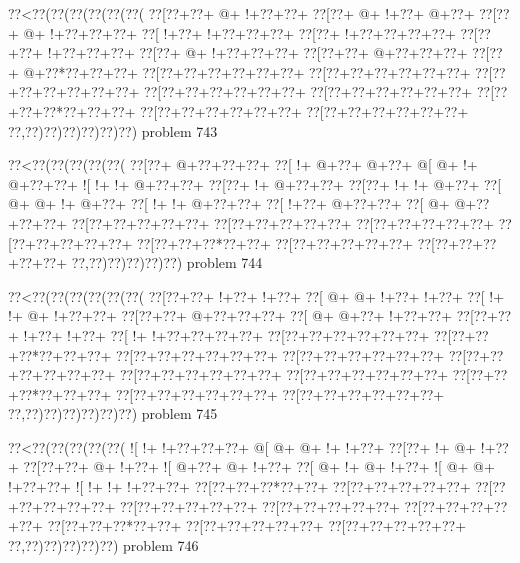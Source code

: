 \vbox{\vbox{\goo
\0??<\0??(\0??(\0??(\0??(\0??(\0??(
\0??[\0??+\0??+\- @+\- !+\0??+\0??+
\0??[\0??+\- @+\- !+\0??+\- @+\0??+
\0??[\0??+\- @+\- !+\0??+\0??+\0??+
\0??[\- !+\0??+\- !+\0??+\0??+\0??+
\0??[\0??+\- !+\0??+\0??+\0??+\0??+
\0??[\0??+\0??+\- !+\0??+\0??+\0??+
\0??[\0??+\- @+\- !+\0??+\0??+\0??+
\0??[\0??+\0??+\- @+\0??+\0??+\0??+
\0??[\0??+\- @+\0??*\0??+\0??+\0??+
\0??[\0??+\0??+\0??+\0??+\0??+\0??+
\0??[\0??+\0??+\0??+\0??+\0??+\0??+
\0??[\0??+\0??+\0??+\0??+\0??+\0??+
\0??[\0??+\0??+\0??+\0??+\0??+\0??+
\0??[\0??+\0??+\0??+\0??+\0??+\0??+
\0??[\0??+\0??+\0??*\0??+\0??+\0??+
\0??[\0??+\0??+\0??+\0??+\0??+\0??+
\0??[\0??+\0??+\0??+\0??+\0??+\0??+
\0??,\0??)\0??)\0??)\0??)\0??)\0??)
}
\hfil problem 743\hfil\break
}

\vbox{\vbox{\goo
\0??<\0??(\0??(\0??(\0??(\0??(
\0??[\0??+\- @+\0??+\0??+\0??+
\0??[\- !+\- @+\0??+\- @+\0??+
\- @[\- @+\- !+\- @+\0??+\0??+
\- ![\- !+\- !+\- @+\0??+\0??+
\0??[\0??+\- !+\- @+\0??+\0??+
\0??[\0??+\- !+\- !+\- @+\0??+
\0??[\- @+\- @+\- !+\- @+\0??+
\0??[\- !+\- !+\- @+\0??+\0??+
\0??[\- !+\0??+\- @+\0??+\0??+
\0??[\- @+\- @+\0??+\0??+\0??+
\0??[\0??+\0??+\0??+\0??+\0??+
\0??[\0??+\0??+\0??+\0??+\0??+
\0??[\0??+\0??+\0??+\0??+\0??+
\0??[\0??+\0??+\0??+\0??+\0??+
\0??[\0??+\0??+\0??*\0??+\0??+
\0??[\0??+\0??+\0??+\0??+\0??+
\0??[\0??+\0??+\0??+\0??+\0??+
\0??,\0??)\0??)\0??)\0??)\0??)
}
\hfil problem 744\hfil\break
}

\vbox{\vbox{\goo
\0??<\0??(\0??(\0??(\0??(\0??(\0??(
\0??[\0??+\0??+\- !+\0??+\- !+\0??+
\0??[\- @+\- @+\- !+\0??+\- !+\0??+
\0??[\- !+\- !+\- @+\- !+\0??+\0??+
\0??[\0??+\0??+\- @+\0??+\0??+\0??+
\0??[\- @+\- @+\0??+\- !+\0??+\0??+
\0??[\0??+\0??+\- !+\0??+\- !+\0??+
\0??[\- !+\- !+\0??+\0??+\0??+\0??+
\0??[\0??+\0??+\0??+\0??+\0??+\0??+
\0??[\0??+\0??+\0??*\0??+\0??+\0??+
\0??[\0??+\0??+\0??+\0??+\0??+\0??+
\0??[\0??+\0??+\0??+\0??+\0??+\0??+
\0??[\0??+\0??+\0??+\0??+\0??+\0??+
\0??[\0??+\0??+\0??+\0??+\0??+\0??+
\0??[\0??+\0??+\0??+\0??+\0??+\0??+
\0??[\0??+\0??+\0??*\0??+\0??+\0??+
\0??[\0??+\0??+\0??+\0??+\0??+\0??+
\0??[\0??+\0??+\0??+\0??+\0??+\0??+
\0??,\0??)\0??)\0??)\0??)\0??)\0??)
}
\hfil problem 745\hfil\break
}

\vbox{\vbox{\goo
\0??<\0??(\0??(\0??(\0??(\0??(
\- ![\- !+\- !+\0??+\0??+\0??+
\- @[\- @+\- @+\- !+\- !+\0??+
\0??[\0??+\- !+\- @+\- !+\0??+
\0??[\0??+\0??+\- @+\- !+\0??+
\- ![\- @+\0??+\- @+\- !+\0??+
\0??[\- @+\- !+\- @+\- !+\0??+
\- ![\- @+\- @+\- !+\0??+\0??+
\- ![\- !+\- !+\- !+\0??+\0??+
\0??[\0??+\0??+\0??*\0??+\0??+
\0??[\0??+\0??+\0??+\0??+\0??+
\0??[\0??+\0??+\0??+\0??+\0??+
\0??[\0??+\0??+\0??+\0??+\0??+
\0??[\0??+\0??+\0??+\0??+\0??+
\0??[\0??+\0??+\0??+\0??+\0??+
\0??[\0??+\0??+\0??*\0??+\0??+
\0??[\0??+\0??+\0??+\0??+\0??+
\0??[\0??+\0??+\0??+\0??+\0??+
\0??,\0??)\0??)\0??)\0??)\0??)
}
\hfil problem 746\hfil\break
}

